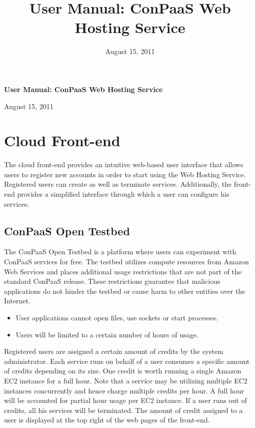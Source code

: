 \documentclass[12pt]{article}
\begin{document}
\title{User Manual: ConPaaS Web Hosting Service}
\date{August 15, 2011}
\thispagestyle{empty}

\begin{center}
\begingroup
\fontsize{20pt}{20pt}\selectfont
\textbf{User Manual: ConPaaS Web Hosting Service} \linebreak
\endgroup

\begingroup
\fontsize{16pt}{16pt}\selectfont
August 15, 2011
\endgroup
\end{center}

\section{Cloud Front-end}
The cloud front-end provides an intuitive web-based user interface that
allows users to register new accounts in order to start using the Web
Hosting Service. Registered users can create as well as terminate
services. Additionally, the front-end provides a simplified interface
through which a user can configure his services.

\subsection{ConPaaS Open Testbed}
The ConPaaS Open Testbed is a platform where users can experiment with ConPaaS
services for free. The testbed utilizes compute resources from Amazon Web
Services and places additional usage restrictions that are not part of the
standard ConPaaS release. These restrictions guarantee that malicious
applications do not hinder the testbed or cause harm to other entities over the
Internet.
\begin{itemize}
  \item User applications cannot open files, use sockets or start processes.
  \item Users will be limited to a certain number of hours of usage.
\end{itemize}
Registered users are assigned a certain amount of credits by the system
administrator. Each service runs on behalf of a user consumes a specific
amount of credits depending on its size. One credit is worth running a single
Amazon EC2 instance for a full hour. Note that a service may be utilizing
multiple EC2 instances concurrently and hence charge multiple credits per hour.
A full hour will be accounted for partial hour usage per EC2 instance. If a
user runs out of credits, all his services will be terminated. The amount of
credit assigned to a user is displayed at the top right of the web pages of
the front-end.
\end{document}

